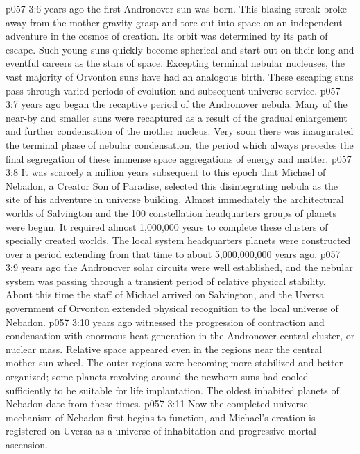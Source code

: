 \vs p057 3:6 \pc {} years ago the first Andronover sun was born. This blazing streak broke away from the mother gravity grasp and tore out into space on an independent adventure in the cosmos of creation. Its orbit was determined by its path of escape. Such young suns quickly become spherical and start out on their long and eventful careers as the stars of space. Excepting terminal nebular nucleuses, the vast majority of Orvonton suns have had an analogous birth. These escaping suns pass through varied periods of evolution and subsequent universe service.
\vs p057 3:7 \pc {} years ago began the recaptive period of the Andronover nebula. Many of the near-by and smaller suns were recaptured as a result of the gradual enlargement and further condensation of the mother nucleus. Very soon there was inaugurated the terminal phase of nebular condensation, the period which always precedes the final segregation of these immense space aggregations of energy and matter.
\vs p057 3:8 It was scarcely a million years subsequent to this epoch that Michael of Nebadon, a Creator Son of Paradise, selected this disintegrating nebula as the site of his adventure in universe building. Almost immediately the architectural worlds of Salvington and the 100 constellation headquarters groups of planets were begun. It required almost 1,000,000 years to complete these clusters of specially created worlds. The local system headquarters planets were constructed over a period extending from that time to about 5,000,000,000 years ago.
\vs p057 3:9 \pc {} years ago the Andronover solar circuits were well established, and the nebular system was passing through a transient period of relative physical stability. About this time the staff of Michael arrived on Salvington, and the Uversa government of Orvonton extended physical recognition to the local universe of Nebadon.
\vs p057 3:10 \pc {} years ago witnessed the progression of contraction and condensation with enormous heat generation in the Andronover central cluster, or nuclear mass. Relative space appeared even in the regions near the central mother\hyp{}sun wheel. The outer regions were becoming more stabilized and better organized; some planets revolving around the newborn suns had cooled sufficiently to be suitable for life implantation. The oldest inhabited planets of Nebadon date from these times.
\vs p057 3:11 Now the completed universe mechanism of Nebadon first begins to function, and Michael’s creation is registered on Uversa as a universe of inhabitation and progressive mortal ascension.
